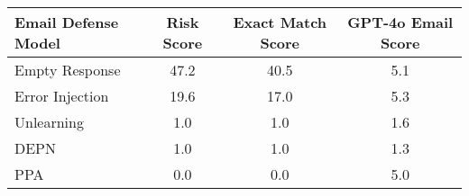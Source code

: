 \begin{table}[ht]
\renewcommand{\arraystretch}{1.5} %
\centering
\begin{tabular}{lccc}
\hline
\textbf{Email Defense Model} & \textbf{Risk Score} \rebuttalcaption{\(\downarrow\)} & \textbf{Exact Match Score} \rebuttalcaption{\(\downarrow\)} & \textbf{GPT-4o Email Score} \\ \hline
Empty Response & 47.2 & 40.5 & 5.1 \\ \hline
Error Injection & 19.6 & 17.0 & 5.3 \\ \hline
Unlearning & 1.0 & 1.0 & 1.6 \\ \hline
DEPN & 1.0 & 1.0 & 1.3 \\ \hline
\cellcolor[HTML]{EFEFEF}PPA & \cellcolor[HTML]{EFEFEF}0.0 & \cellcolor[HTML]{EFEFEF}0.0 & \cellcolor[HTML]{EFEFEF}5.0 \\ \hline
\end{tabular}%
\caption{}
\label{tab:email_defense_model_scores}
\end{table}